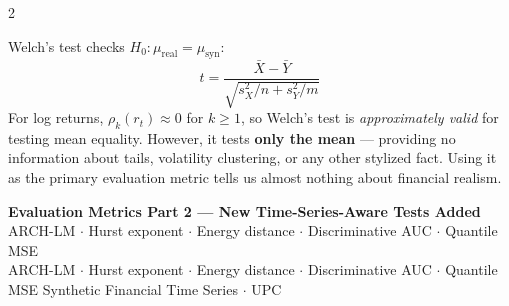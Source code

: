 \documentclass[10pt]{article}
\newcommand{\navybox}[2]{\begin{tcolorbox}[mybox={Navy}{LBg},title={#1}]#2\end{tcolorbox}}
\newcommand{\pagehead}[2]{%
  \begin{tcolorbox}[enhanced,arc=0pt,outer arc=0pt,boxrule=0pt,
    colback=Navy,colframe=Navy,
    top=5pt,bottom=5pt,left=8pt,right=8pt,
    before skip=0pt,after skip=10pt]
  {\color{white}\large\bfseries #1}%
  \ifx\relax#2\relax\else\\[1pt]{\color{blue!30!white}\small #2}\fi
  \hfill{\color{blue!20!white}\footnotesize Synthetic Financial Time Series $\cdot$ UPC}
  \end{tcolorbox}}
\begin{document}
\begin{multicols}{2}
\navybox{Welch's $t$-test: A Narrower Failure}{%
Welch's test checks $H_0: \mu_\text{real} = \mu_\text{syn}$:
\begin{equation*}
  t = \frac{\bar{X} - \bar{Y}}{\sqrt{s^2_X/n + s^2_Y/m}}
\end{equation*}
For log returns, $\rho_k(r_t) \approx 0$ for $k \geq 1$, so Welch's test is \emph{approximately valid} for testing mean equality. However, it tests \textbf{only the mean} --- providing no information about tails, volatility clustering, or any other stylized fact. Using it as the primary evaluation metric tells us almost nothing about financial realism.}

\end{multicols}

\clearpage

\pagehead{Evaluation Metrics Part 2 --- New Time-Series-Aware Tests Added}
         {ARCH-LM $\cdot$ Hurst exponent $\cdot$ Energy distance $\cdot$ Discriminative AUC $\cdot$ Quantile MSE}
\end{document}
